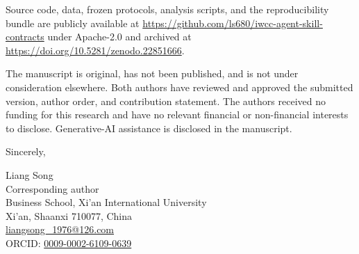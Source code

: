 \documentclass[10pt]{article}
\begin{document}
Source code, data, frozen protocols, analysis scripts, and the reproducibility
bundle are publicly available at
\url{https://github.com/ls680/iwcc-agent-skill-contracts} under Apache-2.0 and
archived at \url{https://doi.org/10.5281/zenodo.22851666}.

The manuscript is original, has not been published, and is not under
consideration elsewhere. Both authors have reviewed and approved the submitted
version, author order, and contribution statement. The authors received no
funding for this research and have no relevant financial or non-financial
interests to disclose. Generative-AI assistance is disclosed in the manuscript.

Sincerely,

Liang Song\\
Corresponding author\\
Business School, Xi'an International University\\
Xi'an, Shaanxi 710077, China\\
\href{mailto:liangsong_1976@126.com}{liangsong\_1976@126.com}\\
ORCID: \href{https://orcid.org/0009-0002-6109-0639}{0009-0002-6109-0639}
\end{document}
